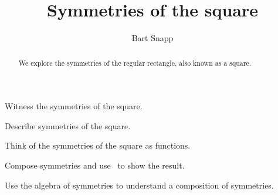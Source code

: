 \documentclass[noauthor,nooutcomes,12pt,hints]{ximera}
\title{Symmetries of the square}
\author{Bart Snapp}
\begin{document}
\begin{abstract}
  We explore the symmetries of the regular rectangle, also known as a
  square.
\end{abstract}
\maketitle

\begin{listOutcomes}
\item Witness the symmetries of the square.
\item Describe symmetries of the square.
\item Think of the symmetries of the square as functions.
\item Compose symmetries and use \snap\ to show the result.
\item Use the algebra of symmetries to understand a composition of
  symmetries.
\end{listOutcomes}
\mynewpage
\end{document}
